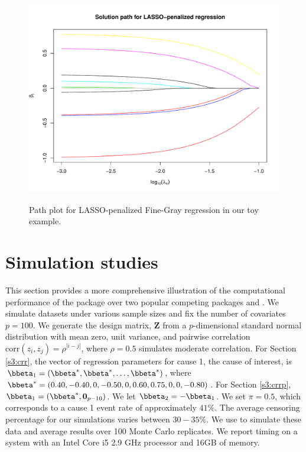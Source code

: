 \begin{figure}[t!]
\centering
\includegraphics[scale = 0.6]{plots/new_LASSO-eps-converted-to.pdf}
\label{fig2:timing}
\caption{Path plot for LASSO-penalized Fine-Gray regression in our toy example.}
\end{figure}

\section{Simulation studies}
\label{s3:sim}
This section provides a more comprehensive illustration of the computational performance of the  package over two popular competing packages  and . 
We simulate datasets under various sample sizes and fix the number of covariates $p = 100$. We generate the design matrix, $\mathbf{Z}$
from a $p$-dimensional standard normal distribution with mean zero, unit variance, and pairwise correlation $\mbox{corr}(z_i, z_j) = \rho^{|i-j|}$, where $\rho = 0.5$ simulates moderate correlation. For Section \ref{s3:crr}, the vector of regression parameters for cause 1, the cause of interest, is $\bbeta_1 = (\bbeta^*, \bbeta^*, \ldots, \bbeta^*)$, where  $\bbeta^* = (0.40, -0.40, 0, -0.50, 0, 0.60, 0.75, 0, 0, -0.80)$. For Section \ref{s3:crrp}, $\bbeta_1 = (\bbeta^*, \mathbf{0}_{p - 10})$. We let $\bbeta_2 = -\bbeta_1$. We set $\pi =  0.5$, which corresponds to a cause 1 event rate of approximately $41\%$.  The average censoring percentage for our simulations varies between $30-35\%$.  We use   to simulate these data and average results over 100 Monte Carlo replicates. We report timing on a system with an Intel Core i5 2.9 GHz processor and 16GB of memory.

